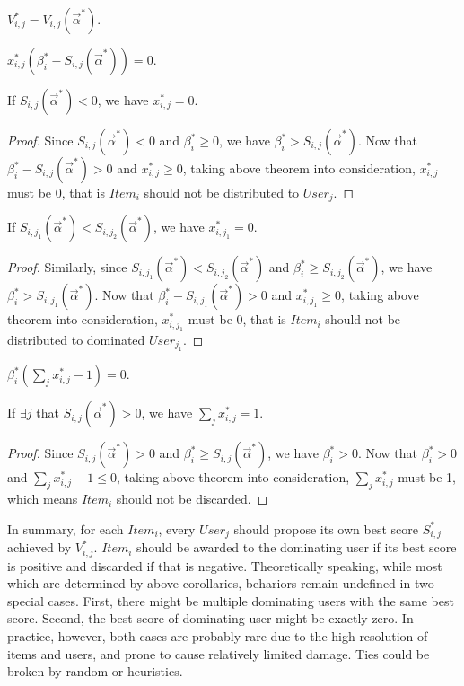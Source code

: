 \documentclass[sigconf]{acmart}
\newcommand{\sx}{x_{i,j}}
\newcommand{\sV}{V_{i,j}}
\newcommand{\sbeta}{\beta_i}
\newcommand{\sS}{S_{i,j}}
\newcommand{\valpha}{\vec{\alpha}}
\begin{document}
\begin{theorem}
$\sV^* = \sV(\valpha^*)$.
\end{theorem}

\begin{theorem}
$\sx^*(\sbeta^* - \sS(\valpha^*)) = 0$.
\end{theorem}

\begin{corollary}
If $\sS(\valpha^*) < 0$, we have $\sx^* = 0$.
\end{corollary}

\begin{proof}
Since $\sS(\valpha^*) < 0$ and $\sbeta^* \ge 0$, we have $\sbeta^* > \sS(\valpha^*)$.
Now that $\sbeta^* - \sS(\valpha^*) > 0$ and $\sx^* \ge 0$,
    taking above theorem into consideration, $\sx^*$ must be 0,
    that is $Item_i$ should not be distributed to $User_j$.
\end{proof}

\begin{corollary}
If $S_{i,j_1}(\valpha^*) < S_{i,j_2}(\valpha^*)$, we have $x_{i,j_1}^* = 0$.
\end{corollary}

\begin{proof}
Similarly, since $S_{i,j_1}(\valpha^*) < S_{i,j_2}(\valpha^*)$ and $\sbeta^* \ge S_{i,j_2}(\valpha^*)$,
    we have $\sbeta^* > S_{i,j_1}(\valpha^*)$.
Now that $\sbeta^* - S_{i,j_1}(\valpha^*) > 0$ and $x_{i,j_1}^* \ge 0$, 
    taking above theorem into consideration, $x_{i,j_1}^*$ must be 0,
    that is $Item_i$ should not be distributed to dominated $User_{j_1}$.
\end{proof}

\begin{theorem}
$\sbeta^*(\sum\limits_j \sx^* - 1) = 0$.
\end{theorem}

\begin{corollary}
If $\exists j$ that $\sS(\valpha^*) > 0$, we have $\sum\limits_j \sx^* = 1$.
\end{corollary}

\begin{proof}
Since $\sS(\valpha^*) > 0$ and $\sbeta^* \ge \sS(\valpha^*)$, we have $\sbeta^* > 0$.
Now that $\sbeta^* > 0$ and $\sum\limits_j \sx^* - 1 \le 0$,
    taking above theorem into consideration, $\sum\limits_j \sx^*$ must be 1,
    which means $Item_i$ should not be discarded.
\end{proof}

In summary, for each $Item_i$, every $User_j$ should propose its own best score $\sS^*$ achieved by $\sV^*$.
$Item_i$ should be awarded to the dominating user if its best score is positive and discarded if that is negative.
Theoretically speaking, while most which are determined by above corollaries, behariors remain undefined in two special cases.
First, there might be multiple dominating users with the same best score.
Second, the best score of dominating user might be exactly zero.
In practice, however, both cases are probably rare due to the high resolution of items and users, and prone to cause relatively limited damage.
Ties could be broken by random or heuristics.
\end{document}
